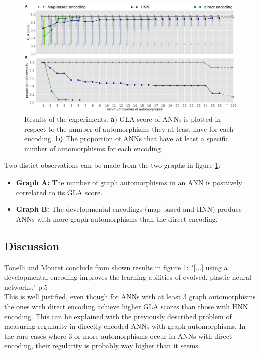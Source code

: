 \documentclass[12pt,twoside]{article}
\theoremstyle{plain}
\theoremstyle{definition}
\theoremstyle{remark}
\begin{document}
\begin{figure}[!h]
	\hspace*{-1.4cm}
	\includegraphics[width=1.2\textwidth]{results.png}
	\caption[Results of the experiments. \textbf{a}) GLA score of ANNs is plotted in respect to the number of automorphisms they at least have for each encoding. \textbf{b)} The proportion of ANNs that have at least a specific number of automorphisms for each encoding.]{Results of the experiments. \textbf{a}) GLA score of ANNs is plotted in respect to the number of automorphisms they at least have for each encoding. \textbf{b)} The proportion of ANNs that have at least a specific number of automorphisms for each encoding.\footnotemark}
	\label{fig:results}
\end{figure}

Two distict observations can be made from the two graphs in figure \ref{fig:results}:
\begin{itemize}
	\item \textbf{Graph A:} The number of graph automorphisms in an ANN is positively correlated to its GLA score. 
	\item \textbf{Graph B:} The developmental encodings (map-based and HNN) produce ANNs with more graph automorphisms than the direct encoding.
\end{itemize}

\subsection{Discussion}
Tonelli and Mouret conclude from shown results in figure \ref{fig:results}: "[...] using a developmental encoding improves the learning abilities of evolved, plastic neural networks." \cite{citeulike:12788284} p.5\\
This is well justified, even though for ANNs with at least 3 graph automorphisms the ones with direct encoding achieve higher GLA scores than those with HNN encoding.
This can be explained with the previously described problem of measuring regularity in directly encoded ANNs with graph automorphisms. In the rare cases where 3 or more automorphisms occur in ANNs with direct encoding, their regularity is probably way higher than it seems.\medskip
\end{document}
